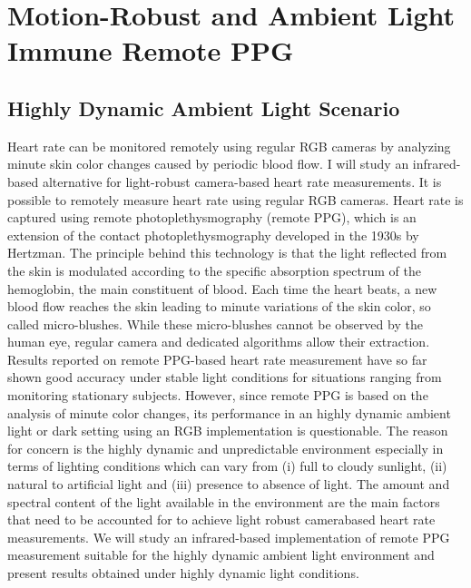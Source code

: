 \chapter{Motion-Robust and Ambient Light Immune Remote PPG} %

\label{Chapter7} %


\section{Highly Dynamic Ambient Light Scenario}\cite {6799899}
Heart rate can be monitored remotely using regular RGB cameras by analyzing minute skin color changes caused
by periodic blood flow. I will study an infrared-based alternative for light-robust camera-based heart
rate measurements. It is possible to remotely measure heart rate using regular RGB cameras.
Heart rate is captured using remote photoplethysmography (remote PPG), which is an extension of the contact
photoplethysmography developed in the 1930s by Hertzman. The principle behind this
technology is that the light reflected from the skin is modulated according to the specific absorption
spectrum of the hemoglobin, the main constituent of blood. Each time the heart beats,
a new blood flow reaches the skin leading to minute variations of the skin color, so called micro-blushes.
While these micro-blushes cannot be observed by the human eye, regular camera and dedicated algorithms
allow their extraction. Results reported on remote PPG-based heart rate measurement have so far shown good
accuracy under stable light conditions for situations ranging from monitoring stationary subjects.
However, since remote PPG is based on the analysis of minute color changes, its performance in an
highly dynamic ambient light or dark setting using an RGB implementation is questionable.
The reason for concern is the highly dynamic and unpredictable environment especially in terms of lighting
conditions which can vary from (i) full to cloudy sunlight, (ii) natural to artificial light and (iii)
presence to absence of light. The amount and spectral content of the light available in the environment
are the main factors that need to be accounted for to achieve light robust camerabased heart rate measurements.
We will study an infrared-based implementation of remote PPG measurement suitable for the highly dynamic ambient light
environment and present results obtained under highly dynamic light conditions.


